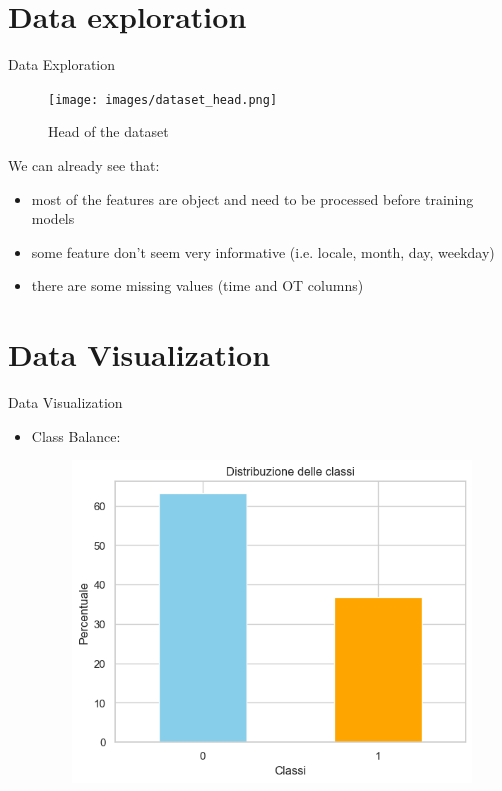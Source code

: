 \documentclass{beamer}
\begin{document}
\section{Data exploration}
\begin{frame}{Data Exploration}
    \begin{figure}
        \centering
        \texttt{[image: images/dataset\_head.png]}
        \caption{Head of the dataset}
        \label{fig:enter-label}
    \end{figure}
    We can already see that:
    \begin{itemize}
        \item most of the features are object and need to be processed before training models
        \item some feature don't seem very informative (i.e. locale, month, day, weekday)
        \item there are some missing values (time and OT columns)
    \end{itemize}
\end{frame}

\section{Data Visualization}
\begin{frame}{Data Visualization}
    \begin{itemize}
        \item Class Balance:
            \begin{figure}
                \centering
                \includegraphics[width=0.75\linewidth]{images/class_balance.png}
            \end{figure}
    \end{itemize}
\end{frame}
\end{document}
